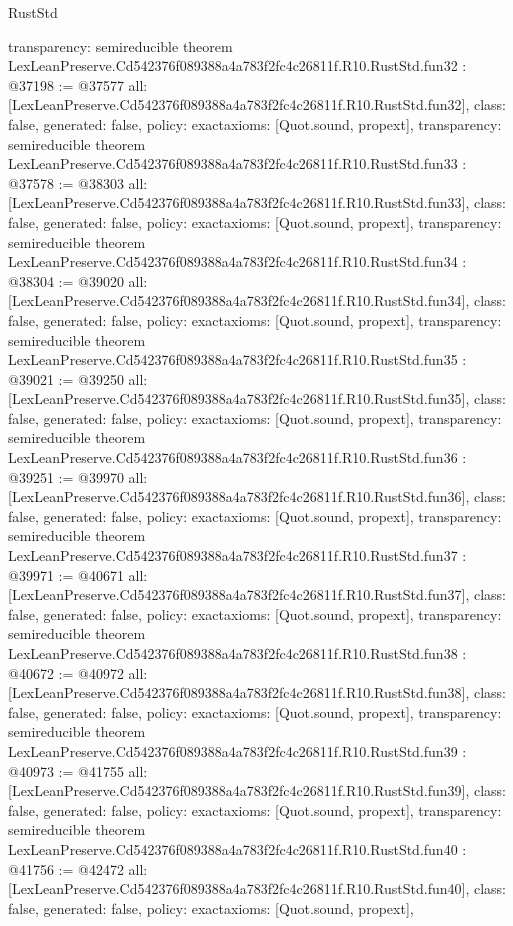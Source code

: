 \begin{lexlean}{RustStd}
\begin{coremodule}
{  transparency: semireducible
}
theorem LexLeanPreserve.Cd542376f089388a4a783f2fc4c26811f.R10.RustStd.fun32 : @37198 := @37577 {
  all: [LexLeanPreserve.Cd542376f089388a4a783f2fc4c26811f.R10.RustStd.fun32],
  class: false,
  generated: false,
  policy: exact{axioms: [Quot.sound, propext]},
  transparency: semireducible
}
theorem LexLeanPreserve.Cd542376f089388a4a783f2fc4c26811f.R10.RustStd.fun33 : @37578 := @38303 {
  all: [LexLeanPreserve.Cd542376f089388a4a783f2fc4c26811f.R10.RustStd.fun33],
  class: false,
  generated: false,
  policy: exact{axioms: [Quot.sound, propext]},
  transparency: semireducible
}
theorem LexLeanPreserve.Cd542376f089388a4a783f2fc4c26811f.R10.RustStd.fun34 : @38304 := @39020 {
  all: [LexLeanPreserve.Cd542376f089388a4a783f2fc4c26811f.R10.RustStd.fun34],
  class: false,
  generated: false,
  policy: exact{axioms: [Quot.sound, propext]},
  transparency: semireducible
}
theorem LexLeanPreserve.Cd542376f089388a4a783f2fc4c26811f.R10.RustStd.fun35 : @39021 := @39250 {
  all: [LexLeanPreserve.Cd542376f089388a4a783f2fc4c26811f.R10.RustStd.fun35],
  class: false,
  generated: false,
  policy: exact{axioms: [Quot.sound, propext]},
  transparency: semireducible
}
theorem LexLeanPreserve.Cd542376f089388a4a783f2fc4c26811f.R10.RustStd.fun36 : @39251 := @39970 {
  all: [LexLeanPreserve.Cd542376f089388a4a783f2fc4c26811f.R10.RustStd.fun36],
  class: false,
  generated: false,
  policy: exact{axioms: [Quot.sound, propext]},
  transparency: semireducible
}
theorem LexLeanPreserve.Cd542376f089388a4a783f2fc4c26811f.R10.RustStd.fun37 : @39971 := @40671 {
  all: [LexLeanPreserve.Cd542376f089388a4a783f2fc4c26811f.R10.RustStd.fun37],
  class: false,
  generated: false,
  policy: exact{axioms: [Quot.sound, propext]},
  transparency: semireducible
}
theorem LexLeanPreserve.Cd542376f089388a4a783f2fc4c26811f.R10.RustStd.fun38 : @40672 := @40972 {
  all: [LexLeanPreserve.Cd542376f089388a4a783f2fc4c26811f.R10.RustStd.fun38],
  class: false,
  generated: false,
  policy: exact{axioms: [Quot.sound, propext]},
  transparency: semireducible
}
theorem LexLeanPreserve.Cd542376f089388a4a783f2fc4c26811f.R10.RustStd.fun39 : @40973 := @41755 {
  all: [LexLeanPreserve.Cd542376f089388a4a783f2fc4c26811f.R10.RustStd.fun39],
  class: false,
  generated: false,
  policy: exact{axioms: [Quot.sound, propext]},
  transparency: semireducible
}
theorem LexLeanPreserve.Cd542376f089388a4a783f2fc4c26811f.R10.RustStd.fun40 : @41756 := @42472 {
  all: [LexLeanPreserve.Cd542376f089388a4a783f2fc4c26811f.R10.RustStd.fun40],
  class: false,
  generated: false,
  policy: exact{axioms: [Quot.sound, propext]},
}
\end{coremodule}
\end{lexlean}
